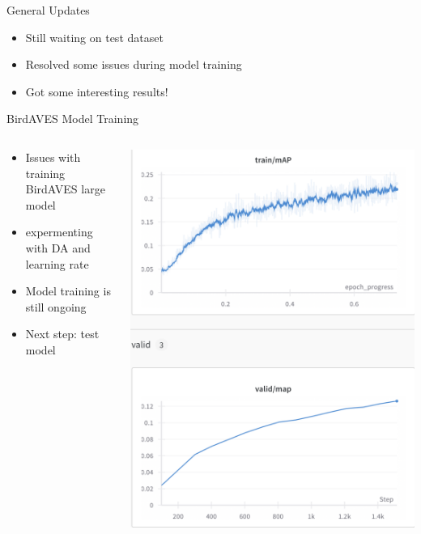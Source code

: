\begin{frame}{General Updates}
    \begin{itemize}
        \item Still waiting on test dataset
        \item Resolved some issues during model training
        \item Got some interesting results!
    \end{itemize}    
\end{frame}

\begin{frame}{BirdAVES Model Training}
    \begin{columns}
        \begin{column}{0.5\textwidth}
        \begin{itemize}
        \item Issues with training BirdAVES large model
        \item expermenting with DA and learning rate
        \item Model training is still ongoing
        \item Next step: test model
        \end{itemize}
    \end{column}
    \begin{column}{0.5\textwidth}
        \centering
        \includegraphics[height=0.85\textheight,width=1\textwidth,keepaspectratio]{images/BirdAVES_cmap.png} 
    \end{column}   
    \end{columns}
\end{frame}
